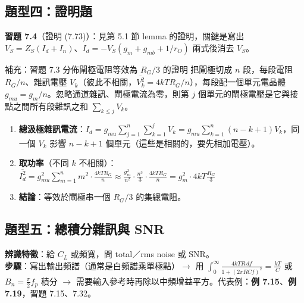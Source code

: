 \documentclass[11pt,a4paper]{article}
\newcommand{\exref}[1]{\textcolor{extag}{\textbf{\sffamily 例 #1}}}
\begin{document}
\subsection{題型四：證明題}
\textbf{習題 7.4}（證明 (7.73)）：見第 5.1 節 lemma 的證明，關鍵是寫出 $V_S=Z_S(I_d+I_n)$、$I_d=-V_S(g_m+g_{mb}+1/r_O)$ 兩式後消去 $V_S$。

\begin{cbox}[boxgray]{補充：習題 7.3 分佈閘極電阻等效為 $R_G/3$ 的證明}
把閘極切成 $n$ 段，每段電阻 $R_G/n$、雜訊電壓 $V_k$（彼此不相關，$\overline{V_k^2}=4kTR_G/n$），每段配一個單元電晶體 $g_{mu}=g_m/n$。忽略通道雜訊、閘極電流為零，則第 $j$ 個單元的閘極電壓是它與接點之間所有段雜訊之和 $\sum_{k\le j}V_k$。
\begin{enumerate}[leftmargin=2.2em]
  \item \textbf{總汲極雜訊電流}：$I_d=g_{mu}\sum_{j=1}^n\sum_{k=1}^jV_k=g_{mu}\sum_{k=1}^n(n-k+1)V_k$，同一個 $V_k$ 影響 $n-k+1$ 個單元（這些是相關的，要先相加電壓）。
  \item \textbf{取功率}（不同 $k$ 不相關）：$\overline{I_d^2}=g_{mu}^2\sum_{m=1}^nm^2\cdot\frac{4kTR_G}{n}\approx\frac{g_m^2}{n^2}\cdot\frac{n^3}{3}\cdot\frac{4kTR_G}{n}=g_m^2\cdot4kT\frac{R_G}{3}$
  \item \textbf{結論}：等效於閘極串一個 $\boxed{R_G/3}$ 的集總電阻。
\end{enumerate}
\end{cbox}

\subsection{題型五：總積分雜訊與 SNR}
\textbf{辨識特徵}：給 $C_L$ 或頻寬，問 total／rms noise 或 SNR。\\
\textbf{步驟}：寫出輸出頻譜（通常是白頻譜乘單極點）$\to$ 用 $\int_0^\infty\frac{4kTR\,df}{1+(2\pi RCf)^2}=\frac{kT}{C}$ 或 $B_n=\frac{\pi}{2}f_p$ 積分 $\to$ 需要輸入參考時再除以中頻增益平方。代表例：\exref{7.15}、\exref{7.19}，習題 7.15、7.32。
\end{document}
